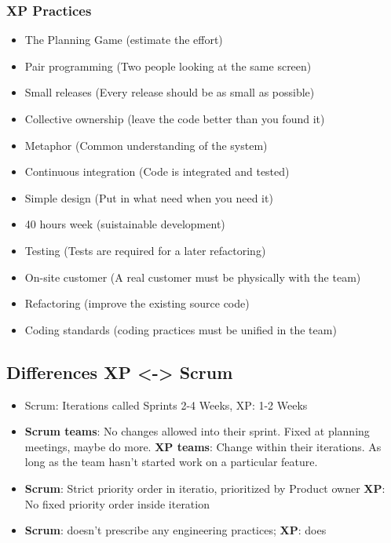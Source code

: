 \hypertarget{xp-practices}{%
\subsubsection{XP Practices}\label{xp-practices}}

\begin{itemize}
\tightlist
\item
  The Planning Game (estimate the effort)
\item
  Pair programming (Two people looking at the same screen)
\item
  Small releases (Every release should be as small as possible)
\item
  Collective ownership (leave the code better than you found it)
\item
  Metaphor (Common understanding of the system)
\item
  Continuous integration (Code is integrated and tested)
\item
  Simple design (Put in what need when you need it)
\item
  40 hours week (suistainable development)
\item
  Testing (Tests are required for a later refactoring)
\item
  On-site customer (A real customer must be physically with the team)
\item
  Refactoring (improve the existing source code)
\item
  Coding standards (coding practices must be unified in the team)
\end{itemize}


\hypertarget{Differences XP <-> Scrum}{%
\subsection{Differences XP <-> Scrum}\label{differnces_xp_scrum}}
\begin{itemize}
  \item 
  Scrum: Iterations called Sprints 2-4 Weeks, XP: 1-2 Weeks
  \item
    \textbf{Scrum teams}: No changes allowed into their sprint. Fixed at planning meetings, maybe do more.
    \textbf{XP teams}: Change within their iterations. As long as the team hasn’t started work on a particular feature.
  \item
    \textbf{Scrum}: Strict priority order in iteratio, prioritized by Product owner
    \textbf{XP}: No fixed priority order inside iteration
  \item
    \textbf{Scrum}: doesn’t prescribe any engineering practices; 
    \textbf{XP}: does
\end{itemize}